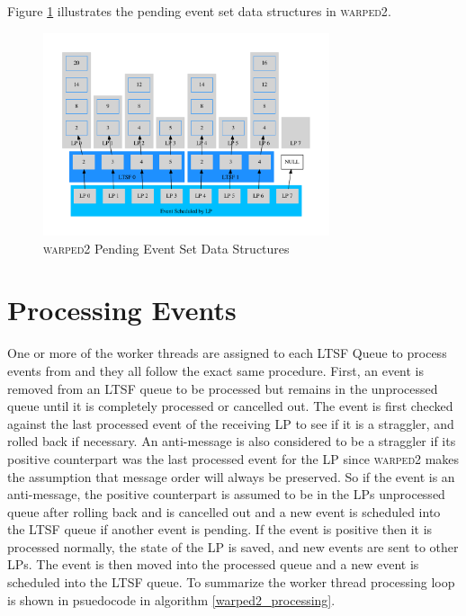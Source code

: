 \documentclass[11pt]{book}
\begin{document}
Figure \ref{pending_event_set} illustrates the pending event set data structures in
\textsc{warped2}.

\begin{figure}[H]
    \centering
    \includegraphics[width=0.75\textwidth]{figs/graphviz/pending_event_set.pdf}
    \caption{\textsc{warped2} Pending Event Set Data Structures}\label{pending_event_set}
\end{figure}

\section{Processing Events}

One or more of the worker threads are assigned to each LTSF Queue to process events from
and they all follow the exact same procedure. First, an event is removed from an LTSF
queue to be processed but remains in the unprocessed queue until it is completely processed or
cancelled out. The event is first checked against the last processed event of the receiving LP
to see if it is a straggler, and rolled back if necessary. An anti-message is also considered to
be a straggler if its positive counterpart was the last processed event for the LP since
\textsc{warped2} makes the assumption that message order will always be preserved.
So if the event is an anti-message, the positive counterpart is assumed to be in the LPs
unprocessed queue after rolling back and is cancelled out and a new event is scheduled into the
LTSF queue if another event is pending. If the event is positive then it is processed normally,
the state of the LP is saved, and new events are sent to other LPs. The event is then moved
into the processed queue and a new event is scheduled into the LTSF queue. To summarize the
worker thread processing loop is shown in psuedocode in algorithm \ref{warped2_processing}.
\end{document}
